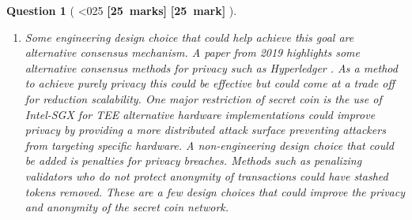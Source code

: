 \documentclass[a4paper]{article}
\theoremstyle{que}
\newtheorem{question}{Question}
\newcommand\points[1]{%
\ifnum1<0#1\relax%
    {\bf \small [#1~marks]}%
  \else%
    {\bf \small [#1~mark]}%
  \fi%
}%
\begin{document}
\begin{question}[\points{25}]
\begin{enumerate}[label=(\alph*)]
    \item[(iii)]
    Some engineering design choice that could help achieve this goal are alternative consensus mechanism. A paper from 2019 highlights some alternative consensus methods for privacy such as Hyperledger \cite{pahlajani2019survey}. As a method to achieve purely privacy this could be effective but could come at a trade off for reduction scalability. One major restriction of secret coin is the use of Intel-SGX for TEE alternative hardware implementations could improve privacy by providing a more distributed attack surface preventing attackers from targeting specific hardware. A non-engineering design choice that could be added is penalties for privacy breaches. Methods such as penalizing validators who do not protect anonymity of transactions could have stashed tokens removed.
    These are a few design choices that could improve the privacy and anonymity of the secret coin network.
  \end{enumerate}
\end{question}

\newpage

\end{document}
